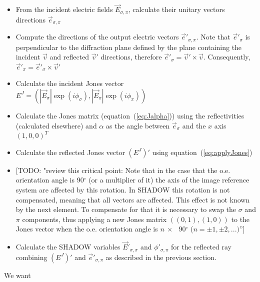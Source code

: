\documentclass{iucr}
\newcommand{\todo}[1]{{\color{red}[TODO: "#1'']}}
\begin{document}
\begin{itemize}
    \item From the incident electric fields $\vec{E}_{\sigma,\pi}$, calculate their unitary vectors directions $\vec{e}_{\sigma,\pi}$

    \item Compute the directions of the output electric vectors $\vec{e}'_{\sigma,\pi}$. Note that $\vec{e}'_{\sigma}$ is perpendicular to the diffraction plane defined by the plane containing the incident $\vec{v}$ and reflected $\vec{v}'$ directions, therefore $\vec{e}'_\sigma=\vec{v}' \times \vec{v}$. Consequently, $\vec{e}'_\pi=\vec{e}'_\sigma \times \vec{v}'$
        
    \item Calculate the incident Jones vector $E^J=(|\vec{E}_\sigma| \exp(i\phi_\sigma), |\vec{E}_\pi| \exp(i\phi_\pi))$
    \item Calculate the Jones matrix (equation~(\ref{eq:Jalpha})) using the reflectivities (calculated elsewhere) and $\alpha$ as the angle between $\vec{e}_\sigma$ and the $x$ axis $(1,0,0)^T$
    \item Calculate the reflected Jones vector $(E^J)'$ using equation~(\ref{eq:applyJones})

    

    \item \todo{review this critical point:  Note that in the case that the o.e. orientation angle is 90$^\circ$ (or a multiplier of it) the axis of the image reference system are affected by this rotation. In SHADOW this rotation is not compensated, meaning that all vectors are affected. This effect is not known by the next element. To compensate for that it is necessary to swap the $\sigma$ and $\pi$ components, thus applying a new Jones matrix $((0,1),(1,0))$ to the Jones vector when the o.e. orientation angle is $n~\times~$~90$^\circ$ ($n=\pm 1, \pm 2, ...)$}
    \item Calculate the SHADOW variables $\vec{E}'_{\sigma,\pi}$ and $\phi'_{\sigma,\pi}$ for the reflected ray combining $(E^J)'$ and $\vec{e}'_{\sigma, \pi}$ as described in the previous section.
\end{itemize}




We want 
\end{document}
